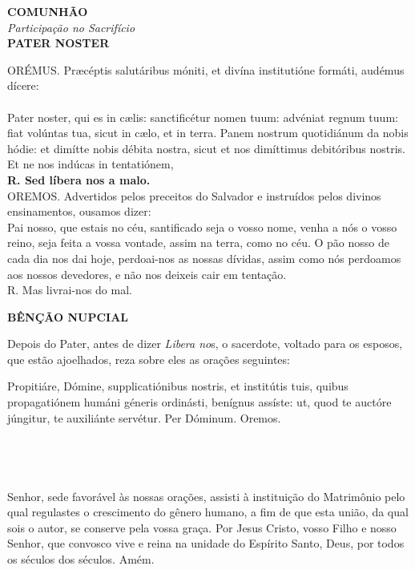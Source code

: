 \begin{center}
	\textbf{COMUNHÃO}
	\\\textit{Participação no Sacrifício}
	\\
	\textbf{PATER NOSTER}
\end{center}

\begin{multicols}{2}
	\noindent ORÉMUS. Præcéptis salutáribus móniti, et divína institutióne formáti, audémus dícere:
	\\
	\\ Pater noster, qui es in cælis: sanctificétur nomen tuum: advéniat regnum tuum: fiat volúntas tua, sicut in cælo, et in terra. Panem nostrum quotidiánum da nobis hódie: et dimítte nobis débita nostra, sicut et nos dimíttimus debitóribus nostris. Et ne nos indúcas in tentatiónem,
	\\ \textbf{R. Sed líbera nos a malo. }
	\\ OREMOS. Advertidos pelos preceitos do Salvador e instruídos pelos divinos ensinamentos, ousamos dizer:
	\\Pai nosso, que estais no céu, santificado seja o vosso nome, venha a nós o vosso reino, seja feita a vossa vontade, assim na terra, como no céu. O pão nosso de cada dia nos dai hoje, perdoai-nos as nossas dívidas, assim como nós perdoamos aos nossos devedores, e não nos deixeis cair em tentação.
	\\ R. Mas livrai-nos do mal.
\end{multicols}
\begin{center}
	\textbf{BÊNÇÃO NUPCIAL}
\end{center}
\begin{flushleft}
	Depois do Pater, antes de dizer \textit{Libera no}s, o sacerdote, voltado para os esposos, que estão ajoelhados, reza sobre eles as orações seguintes:
\end{flushleft}
\begin{multicols}{2}
	\noindent Propitiáre, Dómine, supplicatiónibus nostris, et institútis tuis, quibus propagatiónem humáni géneris ordinásti, benígnus assíste: ut, quod te auctóre júngitur, te auxiliánte servétur. Per Dóminum.
	Oremos. 
	\\
	\\
	\\
	\\
	\\ Senhor, sede favorável às nossas orações, assisti à instituição do Matrimônio pelo qual regulastes o crescimento do gênero humano, a fim de que esta união, da qual sois o autor, se conserve pela vossa graça. Por Jesus Cristo, vosso Filho e nosso Senhor, que convosco vive e reina na unidade do Espírito Santo, Deus, por todos os séculos dos séculos. Amém.
\end{multicols}
